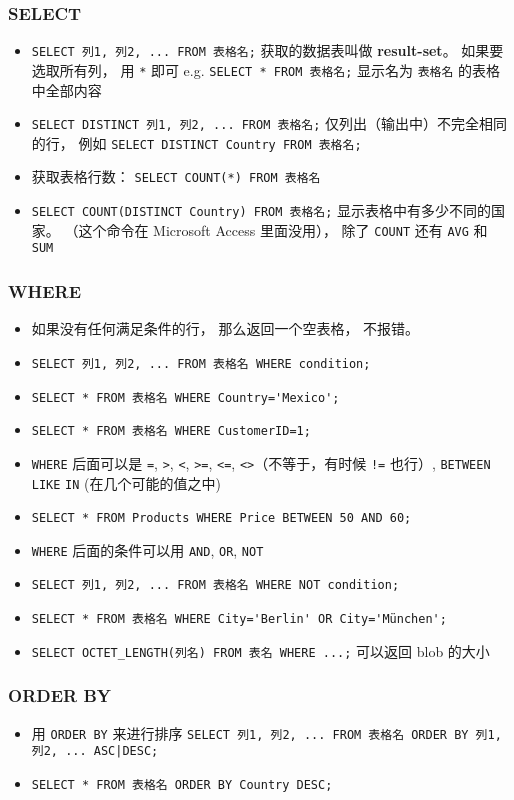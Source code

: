 \subsubsection{SELECT}
\begin{itemize}
\item \verb`SELECT 列1, 列2, ... FROM 表格名;` 获取的数据表叫做 \textbf{result-set}。 如果要选取所有列， 用 \verb`*` 即可 e.g. \verb`SELECT * FROM 表格名;` 显示名为 \verb|表格名| 的表格中全部内容
\item \verb`SELECT DISTINCT 列1, 列2, ... FROM 表格名;` 仅列出（输出中）不完全相同的行， 例如 \verb`SELECT DISTINCT Country FROM 表格名;`
\item 获取表格行数： \verb`SELECT COUNT(*) FROM 表格名`
\item \verb`SELECT COUNT(DISTINCT Country) FROM 表格名;` 显示表格中有多少不同的国家。 （这个命令在 Microsoft Access 里面没用）， 除了 \verb|COUNT| 还有 \verb|AVG| 和 \verb|SUM|
\end{itemize}

\subsubsection{WHERE}
\begin{itemize}
\item 如果没有任何满足条件的行， 那么返回一个空表格， 不报错。
\item \verb`SELECT 列1, 列2, ... FROM 表格名 WHERE condition;`
\item \verb`SELECT * FROM 表格名 WHERE Country='Mexico';`
\item \verb`SELECT * FROM 表格名 WHERE CustomerID=1;`
\item \verb`WHERE` 后面可以是 \verb`=`, \verb`>`, \verb`<`, \verb`>=`, \verb`<=`, \verb`<>`（不等于，有时候 \verb`!=` 也行）, \verb`BETWEEN` \verb`LIKE` \verb`IN` (在几个可能的值之中)
\item \verb`SELECT * FROM Products WHERE Price BETWEEN 50 AND 60;`
\item \verb`WHERE` 后面的条件可以用 \verb`AND`, \verb`OR`, \verb`NOT`
\item \verb`SELECT 列1, 列2, ... FROM 表格名 WHERE NOT condition;`
\item \verb`SELECT * FROM 表格名 WHERE City='Berlin' OR City='München';`
\item \verb`SELECT OCTET_LENGTH(列名) FROM 表名 WHERE ...;` 可以返回 blob 的大小
\end{itemize}

\subsubsection{ORDER BY}
\begin{itemize}
\item 用 \verb`ORDER BY` 来进行排序 \verb`SELECT 列1, 列2, ... FROM 表格名 ORDER BY 列1, 列2, ... ASC|DESC;`
\item \verb`SELECT * FROM 表格名 ORDER BY Country DESC;`
\end{itemize}


